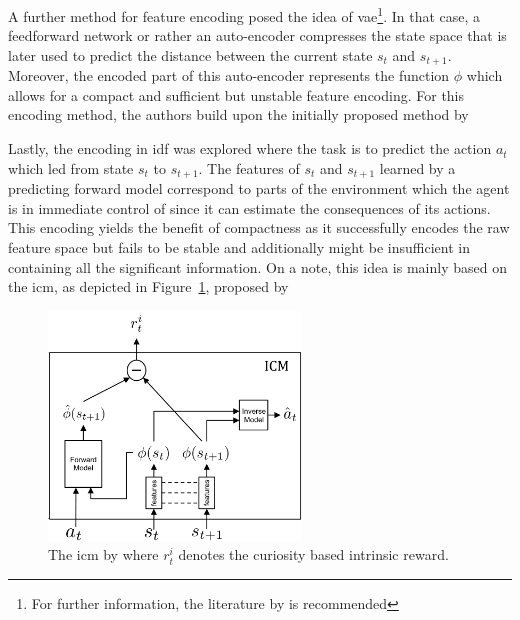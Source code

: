 \documentclass[draft,final]{vutinfth} %
\newcommand{\p}[1]{see p. #1}
\begin{document}
    A further method for feature encoding posed the idea of \gls{vae}\footnote{For further information, the literature by \citet[\p{207-214}]{aggarwal_neural_2018} is recommended}.
    In that case, a feedforward network or rather an auto-encoder compresses the state space that is later used to predict the distance between the current state $s_t$ and $s_{t+1}$.
    Moreover, the encoded part of this auto-encoder represents the function $\phi$ which allows for a compact and sufficient but unstable feature encoding.
    For this encoding method, the authors build upon the initially proposed method by~\citeauthor{stadie_incentivizing_2015}

    Lastly, the encoding in \gls{idf} was explored where the task is to predict the action $a_t$ which led from state $s_t$ to $s_{t+1}$.
    The features of $s_t$ and $s_{t+1}$ learned by a predicting forward model correspond to parts of the environment which the agent is in immediate control of since it can estimate the consequences of its actions.
    This encoding yields the benefit of compactness as it successfully encodes the raw feature space but fails to be stable and additionally might be insufficient in containing all the significant information.
    On a note, this idea is mainly based on the \gls{icm}, as depicted in Figure~\ref{fig:icm}, proposed by \citeauthor{pathak_curiosity-driven_2017-1}

    \begin{figure}[h]
        \centering
        \includegraphics[width=0.6\textwidth]{figures/icm.png}
        \caption[The \gls{icm} by \citeauthor{pathak_curiosity-driven_2017-1}]{The \gls{icm} by \citeauthor{pathak_curiosity-driven_2017-1} where $r_t^i$ denotes the curiosity based intrinsic reward.\protect\footnotemark}
        \label{fig:icm}
    \end{figure}
\end{document}
